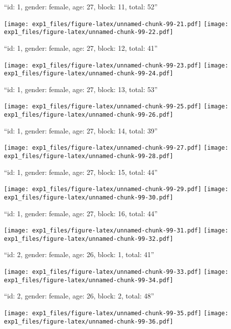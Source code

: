 \documentclass[,]{article}
\begin{document}
\newpage
[1] 

``id: 1, gender: female, age: 27, block: 11, total: 52''

\texttt{[image: exp1\_files/figure-latex/unnamed-chunk-99-21.pdf]}
\texttt{[image: exp1\_files/figure-latex/unnamed-chunk-99-22.pdf]}

\newpage
[1] 

``id: 1, gender: female, age: 27, block: 12, total: 41''

\texttt{[image: exp1\_files/figure-latex/unnamed-chunk-99-23.pdf]}
\texttt{[image: exp1\_files/figure-latex/unnamed-chunk-99-24.pdf]}

\newpage
[1] 

``id: 1, gender: female, age: 27, block: 13, total: 53''

\texttt{[image: exp1\_files/figure-latex/unnamed-chunk-99-25.pdf]}
\texttt{[image: exp1\_files/figure-latex/unnamed-chunk-99-26.pdf]}

\newpage
[1] 

``id: 1, gender: female, age: 27, block: 14, total: 39''

\texttt{[image: exp1\_files/figure-latex/unnamed-chunk-99-27.pdf]}
\texttt{[image: exp1\_files/figure-latex/unnamed-chunk-99-28.pdf]}

\newpage
[1] 

``id: 1, gender: female, age: 27, block: 15, total: 44''

\texttt{[image: exp1\_files/figure-latex/unnamed-chunk-99-29.pdf]}
\texttt{[image: exp1\_files/figure-latex/unnamed-chunk-99-30.pdf]}

\newpage
[1] 

``id: 1, gender: female, age: 27, block: 16, total: 44''

\texttt{[image: exp1\_files/figure-latex/unnamed-chunk-99-31.pdf]}
\texttt{[image: exp1\_files/figure-latex/unnamed-chunk-99-32.pdf]}

\newpage
[1] 

``id: 2, gender: female, age: 26, block: 1, total: 41''

\texttt{[image: exp1\_files/figure-latex/unnamed-chunk-99-33.pdf]}
\texttt{[image: exp1\_files/figure-latex/unnamed-chunk-99-34.pdf]}

\newpage
[1] 

``id: 2, gender: female, age: 26, block: 2, total: 48''

\texttt{[image: exp1\_files/figure-latex/unnamed-chunk-99-35.pdf]}
\texttt{[image: exp1\_files/figure-latex/unnamed-chunk-99-36.pdf]}
\end{document}
